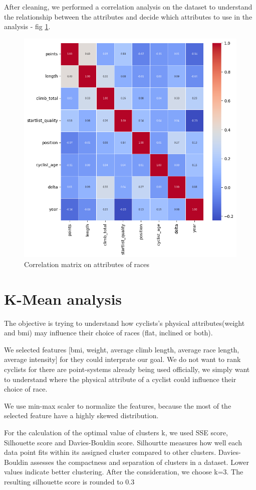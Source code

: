 \documentclass{article}
\begin{document}
After cleaning, we performed a correlation analysis on the dataset to understand the relationship between the attributes and decide which attributes to use in the analysis - fig \ref{fig:7}.
\begin{figure}[H]
    \centering
    \includegraphics[width=0.50\linewidth]{7.png}
    \caption{\label{fig:7}Correlation matrix on attributes of races}
    \end{figure}



















\section{K-Mean analysis}
The objective is trying to understand how cyclists's physical attributes(weight and bmi) may influence their choice of races (flat, inclined or  both).

We selected features [bmi, weight, average climb length, average race length, average intensity] for they could interprate our goal. We do not want to rank cyclists for there are point-systems already being used officially, we simply want to understand where the physical attribute of a cyclist could influence their choice of race.

We use min-max scaler to normalize the features, because the most of the selected feature have a highly skewed distribution.


For the calculation of the optimal value of clusters k, we used SSE score, Silhouette score and Davies-Bouldin score. Silhourtte measures how well each data point fits within its assigned cluster compared to other clusters. Davies-Bouldin assesses the compactness and separation of clusters in a dataset. Lower values indicate better clustering. After the consideration, we choose k=3. The resulting silhouette score is rounded to 0.3
\end{document}
